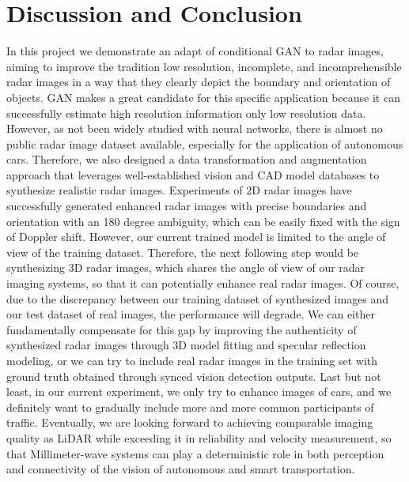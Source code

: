 \section{Discussion and Conclusion} \label{conclusion}
In this project we demonstrate an adapt of conditional GAN to radar images, aiming to improve the tradition low resolution, incomplete, and incomprehensible radar images in a way that they clearly depict the boundary and orientation of objects. GAN makes a great candidate for this specific application because it can successfully estimate high resolution information only low resolution data. However, as not been widely studied with neural networks, there is almost no public radar image dataset available, especially for the application of autonomous cars. Therefore, we also designed a data transformation and augmentation approach that leverages well-established vision and CAD model databases to synthesize realistic radar images. Experiments of 2D radar images have successfully generated enhanced radar images with precise boundaries and orientation with an 180 degree ambiguity, which can be easily fixed with the sign of Doppler shift. However, our current trained model is limited to the angle of view of the training dataset. Therefore, the next following step would be synthesizing 3D radar images, which shares the angle of view of our radar imaging systems, so that it can potentially enhance real radar images. Of course, due to the discrepancy between our training dataset of synthesized images and our test dataset of real images, the performance will degrade. We can either fundamentally compensate for this gap by improving the authenticity of synthesized radar images through 3D model fitting and specular reflection modeling, or we can try to include real radar images in the training set with ground truth obtained through synced vision detection outputs. Last but not least, in our current experiment, we only try to enhance images of cars, and we definitely want to gradually include more and more common participants of traffic. Eventually, we are looking forward to achieving comparable imaging quality as LiDAR while exceeding it in reliability and velocity measurement, so that Millimeter-wave systems can play a deterministic role in both perception and connectivity of the vision of autonomous and smart transportation.        
